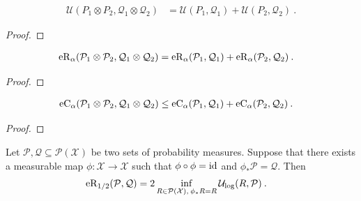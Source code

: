 \begin{lemma}\label{lem:maxUtility_prod}
  \leanok
\begin{align*}
  \mathcal{U}(P_1 \otimes P_2, \mathcal{Q}_1 \otimes \mathcal{Q}_2)
  &= \mathcal{U}(P_1, \mathcal{Q}_1) + \mathcal{U}(P_2, \mathcal{Q}_2)
  \: .
\end{align*}
\end{lemma}

\begin{proof}\leanok

\end{proof}


\begin{lemma}\label{lem:erenyiDiv_prod}
  \leanok
\begin{align*}
  \operatorname{eR}_\alpha(\mathcal{P}_1 \otimes \mathcal{P}_2, \mathcal{Q}_1 \otimes \mathcal{Q}_2)
  &= \operatorname{eR}_\alpha(\mathcal{P}_1, \mathcal{Q}_1) + \operatorname{eR}_\alpha(\mathcal{P}_2, \mathcal{Q}_2)
  \: .
\end{align*}
\end{lemma}

\begin{proof}\leanok

\end{proof}


\begin{lemma}\label{lem:echernoffDiv_prod_le}
  \leanok
\begin{align*}
  \operatorname{eC}_\alpha(\mathcal{P}_1 \otimes \mathcal{P}_2, \mathcal{Q}_1 \otimes \mathcal{Q}_2)
  &\le \operatorname{eC}_\alpha(\mathcal{P}_1, \mathcal{Q}_1) + \operatorname{eC}_\alpha(\mathcal{P}_2, \mathcal{Q}_2)
  \: .
\end{align*}
\end{lemma}

\begin{proof}\leanok

\end{proof}


\begin{lemma}\label{lem:erenyiDiv_map_swap}
  \leanok
Let $\mathcal{P},\mathcal{Q} \subseteq \mathcal{P}(\mathcal{X})$ be two sets of probability measures.
Suppose that there exists a measurable map $\phi : \mathcal{X} \to \mathcal{X}$ such that $\phi \circ \phi = \operatorname{id}$ and $\phi_* \mathcal{P} = \mathcal{Q}$.
Then
\begin{align*}
  \operatorname{eR}_{1/2}(\mathcal{P}, \mathcal{Q})
  &= 2 \inf_{R \in \mathcal{P}(\mathcal{X}), \: \phi_* R = R} \mathcal{U}_{\log}(R, \mathcal{P})
  \: .
\end{align*}
\end{lemma}

